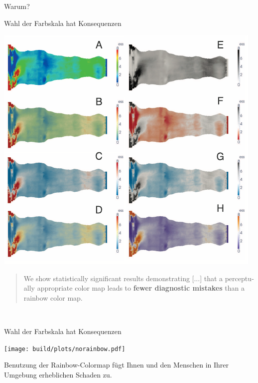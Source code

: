 \documentclass[aspectratio=1610, 9pt]{beamer}
\begin{document}
\begin{frame}[t]{Warum?}
\end{frame}

\begin{frame}[t]{Wahl der Farbskala hat Konsequenzen}
  \begin{center}
    \includegraphics[height=0.7\textheight]{images/heartdisease.pdf}
  \end{center}

  \leavevmode
  \foreignblockquote{english}{%
    We show statistically significant results demonstrating [...]
    that a perceptually appropriate color map
    leads to \textbf{fewer diagnostic mistakes} than a rainbow color map.%
  }\\[0.5\baselineskip]
  \small\cite{heartdisease}
\end{frame}


\begin{frame}[t]{Wahl der Farbskala hat Konsequenzen}  
  \centering

  \texttt{[image: build/plots/norainbow.pdf]}

  \begin{tcolorbox}[colframe=black, colback=white, fontupper=\raggedright\bfseries\zigarette, width=0.68\textwidth, boxrule=4pt, sharp corners]
    Benutzung der Rainbow-Colormap fügt Ihnen
    und den Menschen in Ihrer Umgebung erheblichen Schaden zu.
  \end{tcolorbox}
\end{frame}
\end{document}
